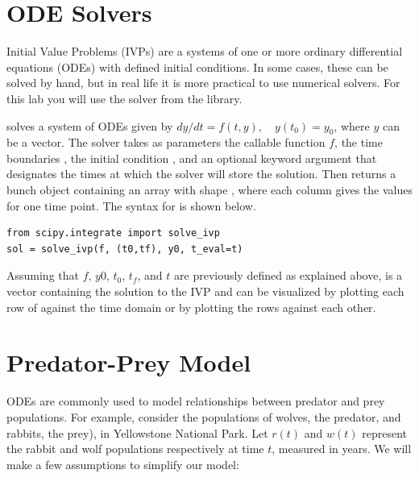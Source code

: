 \label{lab:Weightchange}

\section*{ODE Solvers}
Initial Value Problems (IVPs) are a systems of one or more ordinary differential equations (ODEs) with defined initial conditions. In some cases, these can be solved by hand, but in real life it is more practical to use numerical solvers. For this lab you will use the   solver from the  library.

 solves a system of ODEs given by $dy/dt = f(t, y),\quad y(t_0)=y_0$, where $y$ can be a vector. The solver takes as parameters the callable function $f$, the time boundaries , the initial condition , and an optional keyword argument  that designates the times at which the solver will store the solution. Then  returns a bunch object containing an array  with shape , where each column gives the  values for one time point. The syntax for  is shown below.
\begin{lstlisting}
from scipy.integrate import solve_ivp
sol = solve_ivp(f, (t0,tf), y0, t_eval=t)
\end{lstlisting}
Assuming that $f$, $y0$, $t_0$, $t_f$, and $t$ are previously defined as explained above,  is a vector containing the solution to the IVP and can be visualized by plotting each row of  against the time domain or by plotting the rows against each other.

\section*{Predator-Prey Model} 
ODEs are commonly used to model relationships between predator and prey populations. For example, consider the populations of wolves, the predator, and rabbits, the prey), in Yellowstone National Park. Let $r(t)$ and $w(t)$ represent the rabbit and wolf populations respectively at time $t$, measured in years. 
We will make a few assumptions to simplify our model:

